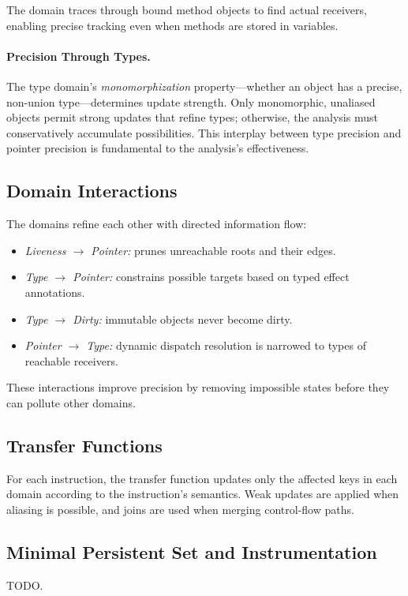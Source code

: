 The domain traces through bound method objects to find actual receivers, enabling precise tracking even when methods are stored in variables.

\paragraph{Precision Through Types.}
The type domain's \emph{monomorphization} property---whether an object has a precise, non-union type---determines update strength. Only monomorphic, unaliased objects permit strong updates that refine types; otherwise, the analysis must conservatively accumulate possibilities. This interplay between type precision and pointer precision is fundamental to the analysis's effectiveness.

\subsection{Domain Interactions}
The domains refine each other with directed information flow:
\begin{itemize}
    \item \emph{Liveness $\rightarrow$ Pointer:} prunes unreachable roots and their edges.
    \item \emph{Type $\rightarrow$ Pointer:} constrains possible targets based on typed effect annotations.
    \item \emph{Type $\rightarrow$ Dirty:} immutable objects never become dirty.
    \item \emph{Pointer $\rightarrow$ Type:} dynamic dispatch resolution is narrowed to types of reachable receivers.
\end{itemize}
These interactions improve precision by removing impossible states before they can pollute other domains.

\subsection{Transfer Functions}
For each instruction, the transfer function updates only the affected keys in each domain according to the instruction's semantics. Weak updates are applied when aliasing is possible, and joins are used when merging control-flow paths.


\subsection{Minimal Persistent Set and Instrumentation}
TODO.
